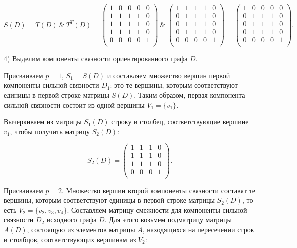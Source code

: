 \documentclass[fleqn]{article}
\begin{document}
$$S(D)= T(D) \:\&\: T^T(D)=
\begin{pmatrix}
1 & 0 & 0 & 0 & 0\\
1 & 1 & 1 & 1 & 0\\
1 & 1 & 1 & 1 & 0\\
1 & 1 & 1 & 1 & 0\\
0 & 0 & 0 & 0 & 1\\
\end{pmatrix}
\:\&\:
\begin{pmatrix}
1 & 1 & 1 & 1 & 0\\
0 & 1 & 1 & 1 & 0\\
0 & 1 & 1 & 1 & 0\\
0 & 1 & 1 & 1 & 0\\
0 & 0 & 0 & 0 & 1\\
\end{pmatrix}
=\begin{pmatrix}
1 & 0 & 0 & 0 & 0 \\
0 & 1 & 1 & 1 & 0 \\
0 & 1 & 1 & 1 & 0 \\
0 & 1 & 1 & 1 & 0 \\
0 & 0 & 0 & 0 & 1 \\
\end{pmatrix}.
$$

4) Выделим компоненты связности ориентированного графа $D$.

Присваиваем $p=1$, $S_1 = S(D)$ и составляем множество вершин
первой компоненты сильной связности $D_1$: это те вершины, которым соответствуют единицы в первой строке матрицы $S(D)$. Таким образом, первая компонента сильной связности состоит из одной вершины $V_1=\{v_1\}$.

Вычеркиваем из матрицы $S_1(D)$ строку и столбец,
соответствующие вершине $v_1$, чтобы получить матрицу $S_2(D)$:

$$S_2(D)=
\begin{pmatrix}
1 & 1 & 1 & 0 \\
1 & 1 & 1 & 0 \\
1 & 1 & 1 & 0 \\
0 & 0 & 0 & 1 \\
\end{pmatrix}.
$$

Присваиваем $p=2$. Множество вершин второй компоненты связности составят те вершины, которым соответствуют единицы в первой строке матрицы $S_2(D)$, то есть $V_2 = \{v_2, v_3, v_4\}$. Составляем
матрицу смежности для компоненты сильной связности $D_2$ исходного
графа $D$. Для этого возьмем подматрицу матрицы $A(D)$, состоящую из элементов матрицы $A$, находящихся на пересечении строк и столбцов, соответствующих вершинам из $V_2$:
\end{document}
